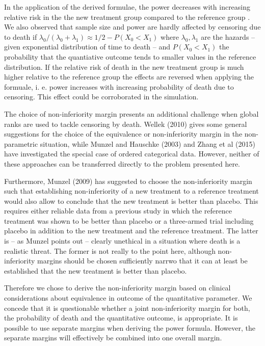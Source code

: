 \documentclass[bimj,fleqn]{w-art}\usepackage[]{graphicx}\usepackage[]{color}
\theoremstyle{plain}
\theoremstyle{definition}
\begin{document}
In the application of the derived formulae, the power decreases with increasing
relative risk in the the new treatment group compared to the reference group . We
also observed that sample size and power are hardly affected by censoring due to
death if $\lambda_0/(\lambda_0 + \lambda_1) \approx 1/2 - P(X_0 < X_1)$ where
$\lambda_0, \lambda_1$ are the hazards -- given exponential distribution of time
to death -- and $P(X_0 < X_1)$ the probability that the quantiative outcome tends
to smaller values in the reference distribution. If the relative risk of death
in the new treatment group is much higher relative to the reference group the
effects are reversed when applying the formuale, i. e. power increases with
increasing probability of death due to censoring. This effect could be
corroborated in the simulation.

The choice of non-inferiority margin presents an additional challenge when global
ranks are used to tackle censoring by death. Wellek (2010) gives some general
suggestions for the choice of the equivalence or non-inferiority margin in the
non-parametric situation, while Munzel and Hauschke (2003) and Zhang et al (2015)
have investigated the special case of ordered categorical data. However, neither
of these approaches can be transferred directly to the problem presented here.

Furthermore, Munzel (2009) has suggested to choose the non-inferiority margin
such that establishing non-inferiority of a new treatment to a reference
treatment would also allow to conclude that the new treatment is better than
placebo. This requires either reliable data from a previous study in which the
reference treatment was shown to be better than placebo or a three-armed trial
including placebo in addition to the new treatment and the reference treatment.
The latter is -- as Munzel points out -- clearly unethical in a situation where
death is a realistic threat. The former is not really to the point here, although
non-inferiority margins should be chosen sufficiently narrwo that it can at
least be established that the new treatment is better than placebo.

Therefore we chose to derive the non-inferiority margin based on clinical
considerations about equivalence in outcome of the quantitative parameter. We
concede that it is questionable whether a joint non-inferiority margin for both,
the probability of death and the quantitative outcome, is appropriate. It is
possible to use separate margins when deriving the power formula. However,
the separate margins will effectively be combined into one overall margin.
\end{document}
